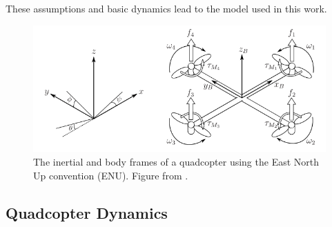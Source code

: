 These assumptions and basic dynamics lead to the model used in this work.

\begin{figure}[htbp]
  \centering
  \includegraphics[width=\linewidth]{img/reference_frames.png}
  \caption{The inertial and body frames of a quadcopter using the East North Up convention (ENU). Figure from \cite{aalto}.}
  \label{fig:reference_frames}
\end{figure}

\subsection{Quadcopter Dynamics}
\label{ssec:dynamics}

